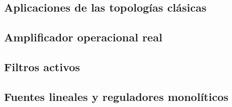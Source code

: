\documentclass{article}
\begin{document}
\subsection{Aplicaciones de las topologías clásicas}

\FloatBarrier
\subsection{Amplificador operacional real}

\FloatBarrier
\subsection{Filtros activos}

\FloatBarrier
\subsection{Fuentes lineales y reguladores monolíticos}

\end{document}
